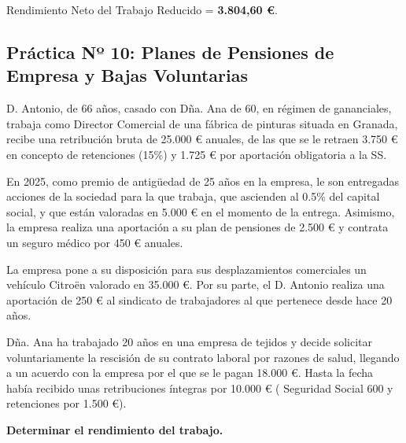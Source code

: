\documentclass[11pt,a4paper,openany]{article}
\begin{document}
\begin{resultadoBox}
Rendimiento Neto del Trabajo Reducido = \textbf{3.804,60 \euro}.
\end{resultadoBox}

\newpage

\subsection{Práctica Nº 10: Planes de Pensiones de Empresa y Bajas Voluntarias}

\begin{enunciadoBox}
D. Antonio, de 66 años, casado con Dña. Ana de 60, en régimen de gananciales, trabaja como Director Comercial de una fábrica de pinturas situada en Granada, recibe una retribución bruta de 25.000 \euro{} anuales, de las que se le retraen 3.750 \euro{} en concepto de retenciones (15\%) y 1.725 \euro{} por aportación obligatoria a la SS.

En 2025, como premio de antigüedad de 25 años en la empresa, le son entregadas acciones de la sociedad para la que trabaja, que ascienden al 0.5\% del capital social, y que están valoradas en 5.000 \euro{} en el momento de la entrega. Asimismo, la empresa realiza una aportación a su plan de pensiones de 2.500 \euro{} y contrata un seguro médico por 450 \euro{} anuales.

La empresa pone a su disposición para sus desplazamientos comerciales un vehículo Citroën valorado en 35.000 \euro{}. Por su parte, el D. Antonio realiza una aportación de 250 \euro{} al sindicato de trabajadores al que pertenece desde hace 20 años.

Dña. Ana ha trabajado 20 años en una empresa de tejidos y decide solicitar voluntariamente la rescisión de su contrato laboral por razones de salud, llegando a un acuerdo con la empresa por el que se le pagan 18.000 \euro{}. Hasta la fecha había recibido unas retribuciones íntegras por 10.000 \euro{} ( Seguridad Social 600 y retenciones por 1.500 \euro{}).

\textbf{Determinar el rendimiento del trabajo.}
\end{enunciadoBox}
\end{document}
